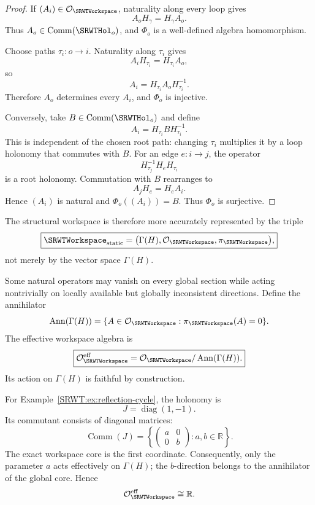 \begin{proof}
If \((A_i)\in\mathcal O_{\SRWTWorkspace}\), naturality along every loop gives
\[
A_oH_\gamma=H_\gamma A_o.
\]
Thus \(A_o\in\operatorname{Comm}(\SRWTHol_o)\), and \(\Phi_o\) is a well-defined
algebra homomorphism.

Choose paths \(\tau_i:o\to i\). Naturality along \(\tau_i\) gives
\[
A_iH_{\tau_i}=H_{\tau_i}A_o,
\]
so
\[
A_i=H_{\tau_i}A_oH_{\tau_i}^{-1}.
\]
Therefore \(A_o\) determines every \(A_i\), and \(\Phi_o\) is injective.

Conversely, take \(B\in\operatorname{Comm}(\SRWTHol_o)\) and define
\[
A_i=H_{\tau_i}BH_{\tau_i}^{-1}.
\]
This is independent of the chosen root path: changing \(\tau_i\) multiplies
it by a loop holonomy that commutes with \(B\). For an edge \(e:i\to j\), the
operator
\[
H_{\tau_j}^{-1}H_eH_{\tau_i}
\]
is a root holonomy. Commutation with \(B\) rearranges to
\[
A_jH_e=H_eA_i.
\]
Hence \((A_i)\) is natural and \(\Phi_o((A_i))=B\). Thus \(\Phi_o\) is
surjective.
\end{proof}

The structural workspace is therefore more accurately represented by the
triple
\[
\boxed{
\SRWTWorkspace_{\mathrm{static}}
=
\bigl(
\Gamma(H),
\mathcal O_{\SRWTWorkspace},
\pi_{\SRWTWorkspace}
\bigr),
}
\]
not merely by the vector space \(\Gamma(H)\).


Some natural operators may vanish on every global section while acting
nontrivially on locally available but globally inconsistent directions. Define
the annihilator
\[
\operatorname{Ann}(\Gamma(H))
=
\{A\in\mathcal O_{\SRWTWorkspace}:
\pi_{\SRWTWorkspace}(A)=0\}.
\]
The effective workspace algebra is
\[
\boxed{
\mathcal O_{\SRWTWorkspace}^{\mathrm{eff}}
=
\mathcal O_{\SRWTWorkspace}/\operatorname{Ann}(\Gamma(H)).
}
\]
Its action on \(\Gamma(H)\) is faithful by construction.

\begin{SRWTexample}\label{SRWT:ex:reflection-operators}
For Example~\ref{SRWT:ex:reflection-cycle}, the holonomy is
\[
J=\operatorname{diag}(1,-1).
\]
Its commutant consists of diagonal matrices:
\[
\operatorname{Comm}(J)
=
\left\{
\begin{pmatrix}a&0\\0&b\end{pmatrix}:a,b\in\mathbb R
\right\}.
\]
The exact workspace core is the first coordinate. Consequently, only the
parameter \(a\) acts effectively on \(\Gamma(H)\); the \(b\)-direction belongs
to the annihilator of the global core. Hence
\[
\mathcal O_{\SRWTWorkspace}^{\mathrm{eff}}\cong\mathbb R.
\]
\end{SRWTexample}

